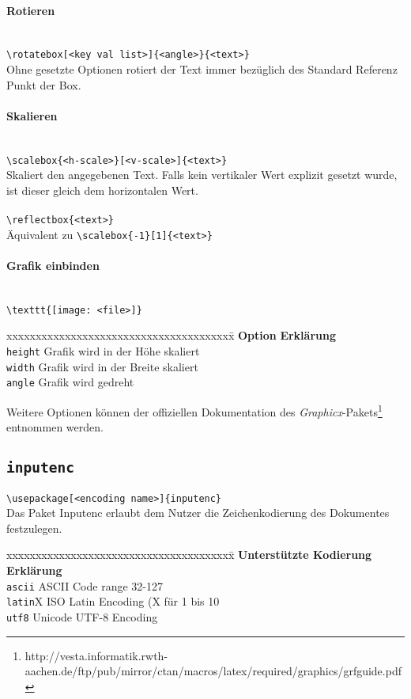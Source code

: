 \paragraph{Rotieren}\leavevmode \\
\verb=\rotatebox[<key val list>]{<angle>}{<text>}=\\
Ohne gesetzte Optionen rotiert der Text immer bezüglich des Standard Referenz Punkt der Box.
\paragraph{Skalieren}\leavevmode \\
\verb=\scalebox{<h-scale>}[<v-scale>]{<text>}=\\
Skaliert den angegebenen Text. Falls kein vertikaler Wert explizit gesetzt wurde, ist dieser gleich dem horizontalen Wert.\\
\\
\verb=\reflectbox{<text>}=\\
Äquivalent zu \verb=\scalebox{-1}[1]{<text>}=
\paragraph{Grafik einbinden}\leavevmode \\
\verb=\texttt{[image: <file>]}=\\
\begin{tabbing}
xxxxxxxxxxxxxxxxxxxxxxxxxxxxxxxxxxxxxxx\=\kill
\textbf{Option}			\>\textbf{Erklärung}\\
\verb=height=			\>Grafik wird in der Höhe skaliert\\
\verb=width=			\>Grafik wird in der Breite skaliert\\
\verb=angle=			\>Grafik wird gedreht\\
\end{tabbing}
Weitere Optionen können der offiziellen Dokumentation des \textsl{Graphicx}-Pakets\footnote{http://vesta.informatik.rwth-aachen.de/ftp/pub/mirror/ctan/macros/latex/required/graphics/grfguide.pdf} entnommen werden.
\subsection{\texttt{inputenc}}
\verb=\usepackage[<encoding name>]{inputenc}=\\
Das Paket \textsf{Inputenc} erlaubt dem Nutzer die Zeichenkodierung des Dokumentes festzulegen.
\begin{tabbing}
xxxxxxxxxxxxxxxxxxxxxxxxxxxxxxxxxxxxxxx\=\kill
\textbf{Unterstützte Kodierung}		\>\textbf{Erklärung}\\
\verb=ascii=					\>ASCII Code range 32-127\\
\verb=latin=X					\>ISO Latin Encoding (X für 1 bis 10\\
\verb=utf8=					\>Unicode UTF-8 Encoding\\
\end{tabbing}
